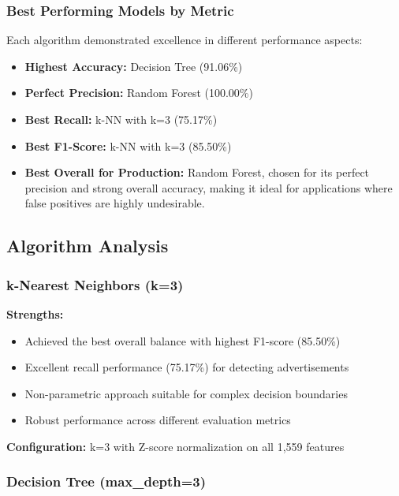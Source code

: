 \subsubsection{Best Performing Models by Metric}

Each algorithm demonstrated excellence in different performance aspects:

\begin{itemize}
    \item \textbf{Highest Accuracy:} Decision Tree (91.06\%)
    \item \textbf{Perfect Precision:} Random Forest (100.00\%)
    \item \textbf{Best Recall:} k-NN with k=3 (75.17\%)
    \item \textbf{Best F1-Score:} k-NN with k=3 (85.50\%)
    \item \textbf{Best Overall for Production:} Random Forest, chosen for its perfect precision and strong overall accuracy, making it ideal for applications where false positives are highly undesirable.
\end{itemize}

\subsection{Algorithm Analysis}

\subsubsection{k-Nearest Neighbors (k=3)}

\textbf{Strengths:}
\begin{itemize}
    \item Achieved the best overall balance with highest F1-score (85.50\%)
    \item Excellent recall performance (75.17\%) for detecting advertisements
    \item Non-parametric approach suitable for complex decision boundaries
    \item Robust performance across different evaluation metrics
\end{itemize}

\textbf{Configuration:} k=3 with Z-score normalization on all 1,559 features

\subsubsection{Decision Tree (max\_depth=3)}

